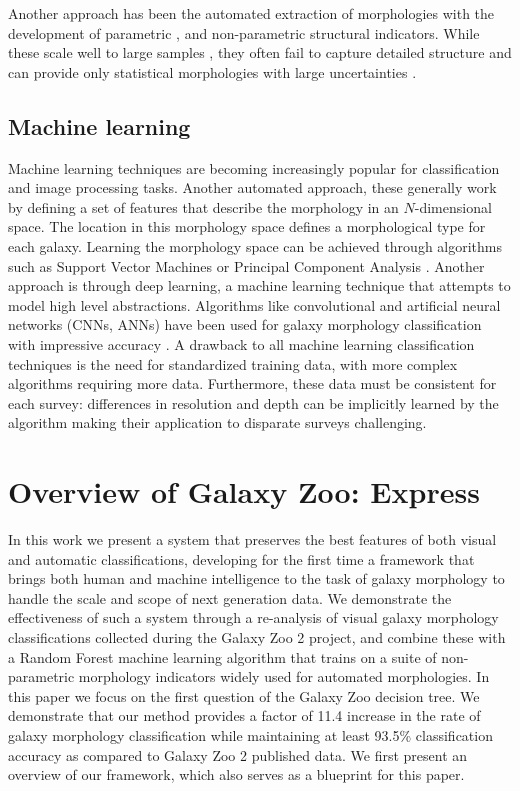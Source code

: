 Another approach has been the automated extraction of morphologies with the development of parametric \citep{Sersic1968, Odewahn2002, Peng2002}, and non-parametric 
\citep{Abraham1994, 
	   Conselice2003, 
	   Abraham2003, 
	   Lotz2004,  
	   Freeman2013} 
structural indicators. While these scale well to large samples 
\citep[e.g.,][]{Simard2011, 
			Griffith2012, 
			Casteels2014, 
			Holwerda2014, 
			Meert2016}, 
they often fail to capture detailed structure and can provide only statistical morphologies with large uncertainties \cite[e.g.,][]{Abraham1996, Bershady2000}. 


\subsection{Machine learning}
Machine learning techniques are becoming increasingly popular for classification and image processing tasks. Another automated approach, these generally work by defining a set of features that describe the morphology in an $N$-dimensional space. The location in this morphology space defines a morphological type for each galaxy. Learning the morphology space can be achieved through algorithms such as Support Vector Machines \citep{HuertasCompany2008} or Principal Component Analysis \citep{Watanabe1985, Scarlata2007}. Another approach is through deep learning, a machine learning technique that attempts to model high level abstractions. Algorithms like convolutional and artificial neural networks (CNNs, ANNs) have been used for galaxy morphology classification with impressive accuracy 
\citep{Ball2004, 
	Banerji2010, 
	Dieleman2015, 
	HuertasCompany2015}. 
A drawback to all machine learning classification techniques is the need for standardized training data, with more complex algorithms requiring more data. Furthermore, these data must be consistent for each survey: differences in resolution and depth can be implicitly learned by the algorithm making their application to disparate surveys challenging. 


\section{Overview of Galaxy Zoo: Express}

 In this work we present a system that preserves the best features of both visual and automatic classifications, developing for the first time a framework that brings both human and machine intelligence to the task of galaxy morphology to handle the scale and scope of next generation data. We demonstrate the effectiveness of such a system through a re-analysis of visual galaxy morphology classifications collected during the Galaxy Zoo 2 project, and combine these with a Random Forest machine learning algorithm that trains on a suite of non-parametric morphology indicators widely used for automated morphologies. In this paper we focus on the first question of the Galaxy Zoo decision tree. We demonstrate that our method provides a factor of 11.4 increase in the rate of galaxy morphology classification  while maintaining at least 93.5\% classification accuracy as compared to Galaxy Zoo 2 published data. We first present an overview of our framework, which also serves as a blueprint for this paper. 


